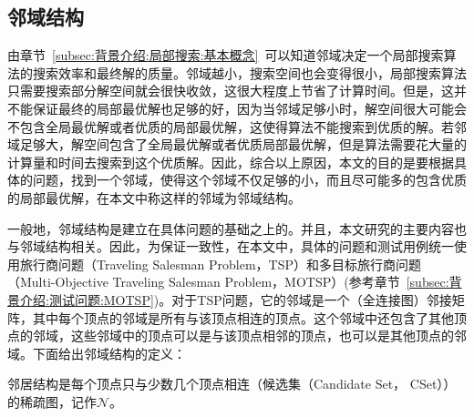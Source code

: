 \subsection{邻域结构}
\label{subsec:背景介绍:局部搜索:邻域结构}
由章节~\ref{subsec:背景介绍:局部搜索:基本概念}~可以知道邻域决定一个局部搜索算法的搜索效率和最终解的质量。邻域越小，搜索空间也会变得很小，局部搜索算法只需要搜索部分解空间就会很快收敛，这很大程度上节省了计算时间。但是，这并不能保证最终的局部最优解也足够的好，因为当邻域足够小时，解空间很大可能会不包含全局最优解或者优质的局部最优解，这使得算法不能搜索到优质的解。若邻域足够大，解空间包含了全局最优解或者优质局部最优解，但是算法需要花大量的计算量和时间去搜索到这个优质解。因此，综合以上原因，本文的目的是要根据具体的问题，找到一个邻域，使得这个邻域不仅足够的小，而且尽可能多的包含优质的局部最优解，在本文中称这样的邻域为邻域结构。
\par
一般地，邻域结构是建立在具体问题的基础之上的。并且，本文研究的主要内容也与邻域结构相关。因此，为保证一致性，在本文中，具体的问题和测试用例统一使用旅行商问题（Traveling Salesman Problem，TSP）和多目标旅行商问题（Multi-Objective Traveling Salesman Problem，MOTSP）(参考章节~\ref{subsec:背景介绍:测试问题:MOTSP})。对于TSP问题，它的邻域是一个（全连接图）邻接矩阵，其中每个顶点的邻域是所有与该顶点相连的顶点。这个邻域中还包含了其他顶点的邻域，这些邻域中的顶点可以是与该顶点相邻的顶点，也可以是其他顶点的邻域。下面给出邻域结构的定义：
\begin{definition}
    \label{def:邻域结构}
    邻居结构是每个顶点只与少数几个顶点相连（候选集（Candidate Set， CSet））的稀疏图，记作$\mathcal{N}$。
\end{definition}
